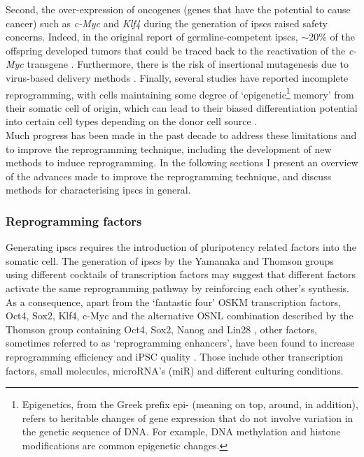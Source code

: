 Second, the over-expression of oncogenes (genes that have the potential to cause cancer) such as \textit{c-Myc} and \textit{Klf4} during the generation of \glspl{ipsc} raised safety concerns.
Indeed, in the original report of germline-competent \glspl{ipsc}, $\sim$20\% of the offspring developed tumors that could be traced back to the reactivation of the \textit{c-Myc} transgene \cite{okita2007generation}. 
Furthermore, there is the risk of insertional mutagenesis due to virus-based delivery methods \cite{takahashi2006induction, takahashi2007induction, yu2007induced}. 
Finally, several studies have reported incomplete reprogramming, with cells maintaining some degree of `epigenetic\footnote{Epigenetics, from the Greek prefix epi- (meaning on top, around, in addition), refers to heritable changes of gene expression that do not involve variation in the genetic sequence of DNA.
For example, DNA methylation and histone modifications are common epigenetic changes.} memory' from their somatic cell of origin, which can lead to their biased differentiation potential into certain cell types depending on the donor cell source \cite{kim2010epigenetic, polo2010cell}.\\

Much progress has been made in the past decade to address these limitations and to improve the reprogramming technique, including the development of new methods to induce reprogramming. 
In the following sections I present an overview of the advances made to improve the reprogramming technique, and discuss methods for characterising \glspl{ipsc} in general. 

\subsubsection{Reprogramming factors}

Generating \glspl{ipsc} requires the introduction of pluripotency related factors into the somatic cell. 
The generation of \glspl{ipsc} by the Yamanaka and Thomson groups using different cocktails of transcription factors may suggest that different factors activate the same reprogramming pathway by reinforcing each other’s synthesis.
As a consequence, apart from the `fantastic four' OSKM transcription factors, Oct4, Sox2, Klf4, c-Myc and the alternative OSNL combination described by the Thomson group containing Oct4, Sox2, Nanog and Lin28 \cite{yu2007induced}, other factors, sometimes referred to as `reprogramming enhancers', have been found to increase reprogramming efficiency and iPSC quality \cite{takahashi2016decade}.
Those include other transcription factors, small molecules, microRNA’s (miR) and different culturing conditions. 


